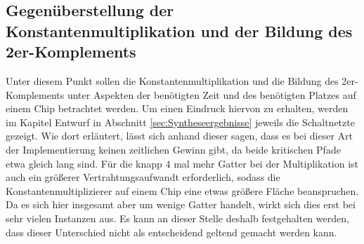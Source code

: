 \subsection{Gegenüberstellung der Konstantenmultiplikation und der Bildung des 2er-Komplements}

Unter diesem Punkt sollen die Konstantenmultiplikation und die Bildung des 2er-Komplements unter Aspekten der benötigten Zeit und des benötigten Platzes auf einem Chip 
betrachtet werden. Um einen Eindruck hiervon zu erhalten, werden im Kapitel Entwurf in Abschnitt \ref{sec:Syntheseergebnisse} jeweils die Schaltnetzte 
gezeigt.
Wie dort erläutert, lässt sich anhand dieser sagen, dass es bei dieser Art der Implementierung keinen zeitlichen Gewinn gibt, da beide kritischen Pfade etwa gleich lang 
sind. Für die knapp $4$ mal mehr Gatter bei der Multiplikation ist auch ein größerer Vertrahtungsaufwandt erforderlich, sodass die Konstantenmultiplizierer
auf einem Chip eine etwas größere Fläche beanspruchen. Da es sich hier insgesamt aber um wenige Gatter handelt, wirkt sich dies erst bei sehr vielen Instanzen aus.
Es kann an dieser Stelle deshalb festgehalten werden, dass dieser Unterschied nicht als entscheidend geltend gemacht werden kann.



